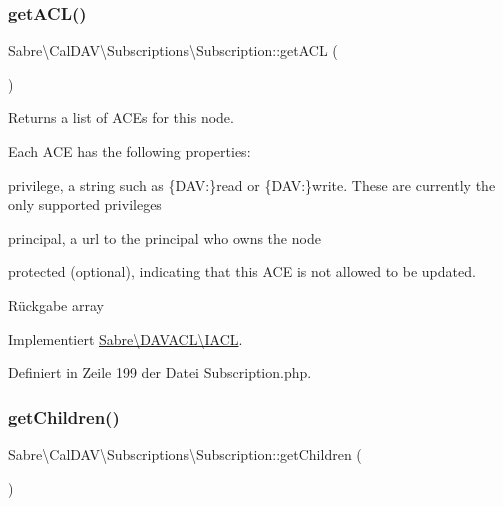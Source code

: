 \subsubsection{\texorpdfstring{get\+A\+C\+L()}{getACL()}}
{\footnotesize\ttfamily Sabre\textbackslash{}\+Cal\+D\+A\+V\textbackslash{}\+Subscriptions\textbackslash{}\+Subscription\+::get\+A\+CL (\begin{DoxyParamCaption}{ }\end{DoxyParamCaption})}

Returns a list of A\+CE\textquotesingle{}s for this node.

Each A\+CE has the following properties\+:
\begin{DoxyItemize}
\item \textquotesingle{}privilege\textquotesingle{}, a string such as \{D\+AV\+:\}read or \{D\+AV\+:\}write. These are currently the only supported privileges
\item \textquotesingle{}principal\textquotesingle{}, a url to the principal who owns the node
\item \textquotesingle{}protected\textquotesingle{} (optional), indicating that this A\+CE is not allowed to be updated.
\end{DoxyItemize}

\begin{DoxyReturn}{Rückgabe}
array 
\end{DoxyReturn}


Implementiert \mbox{\hyperlink{interface_sabre_1_1_d_a_v_a_c_l_1_1_i_a_c_l_a8fe3b3a5b48eae789d7eb722b340045c}{Sabre\textbackslash{}\+D\+A\+V\+A\+C\+L\textbackslash{}\+I\+A\+CL}}.



Definiert in Zeile 199 der Datei Subscription.\+php.

\mbox{\label{class_sabre_1_1_cal_d_a_v_1_1_subscriptions_1_1_subscription_a167dfe0d1f2dd478b1e3e80da4240d98}} 
\subsubsection{\texorpdfstring{get\+Children()}{getChildren()}}
{\footnotesize\ttfamily Sabre\textbackslash{}\+Cal\+D\+A\+V\textbackslash{}\+Subscriptions\textbackslash{}\+Subscription\+::get\+Children (\begin{DoxyParamCaption}{ }\end{DoxyParamCaption})}


